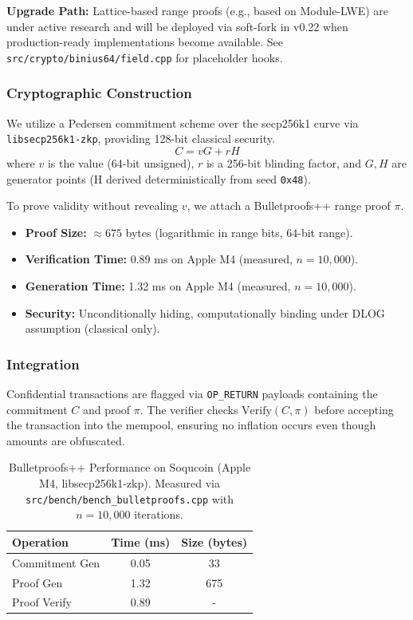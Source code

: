 \documentclass[10pt]{article}
\begin{document}
\textbf{Upgrade Path:} Lattice-based range proofs (e.g., based on Module-LWE) are under active research and will be deployed via soft-fork in v0.22 when production-ready implementations become available. See \texttt{src/crypto/binius64/field.cpp} for placeholder hooks.

\subsubsection{Cryptographic Construction}
We utilize a Pedersen commitment scheme over the secp256k1 curve via \texttt{libsecp256k1-zkp}, providing 128-bit classical security.
\begin{equation}
C = v G + r H
\end{equation}
where $v$ is the value (64-bit unsigned), $r$ is a 256-bit blinding factor, and $G, H$ are generator points (H derived deterministically from seed \texttt{0x48}).

To prove validity without revealing $v$, we attach a Bulletproofs++ range proof $\pi$.
\begin{itemize}
    \item \textbf{Proof Size:} $\approx 675$ bytes (logarithmic in range bits, 64-bit range).
    \item \textbf{Verification Time:} 0.89 ms on Apple M4 (measured, $n=10{,}000$).
    \item \textbf{Generation Time:} 1.32 ms on Apple M4 (measured, $n=10{,}000$).
    \item \textbf{Security:} Unconditionally hiding, computationally binding under DLOG assumption (classical only).
\end{itemize}

\subsubsection{Integration}
Confidential transactions are flagged via \texttt{OP\_RETURN} payloads containing the commitment $C$ and proof $\pi$. The verifier checks $\text{Verify}(C, \pi)$ before accepting the transaction into the mempool, ensuring no inflation occurs even though amounts are obfuscated.

\begin{table}[h]
\centering
\begin{tabular}{|l|c|c|}
\hline
\textbf{Operation} & \textbf{Time (ms)} & \textbf{Size (bytes)} \\
\hline
Commitment Gen & 0.05 & 33 \\
Proof Gen & 1.32 & 675 \\
Proof Verify & 0.89 & - \\
\hline
\end{tabular}
\caption{Bulletproofs++ Performance on Soqucoin (Apple M4, libsecp256k1-zkp). Measured via \texttt{src/bench/bench\_bulletproofs.cpp} with $n=10{,}000$ iterations.}
\label{tab:bp_bench}
\end{table}
\end{document}
